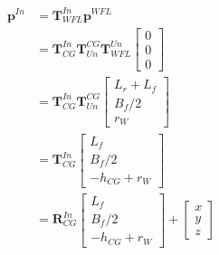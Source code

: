 \begin{align}
  \mathbf{p}^{In} &= \mathbf{T}_{WFL}^{In}\mathbf{p}^{WFL} \\
  &= \mathbf{T}_{CG}^{In}\mathbf{T}_{Un}^{CG}\mathbf{T}_{WFL}^{Un}
  \begin{bmatrix}
    0 \\ 0 \\ 0
  \end{bmatrix} \\
  &= \mathbf{T}_{CG}^{In}\mathbf{T}_{Un}^{CG}
  \begin{bmatrix}
    L_r+L_f \\ B_f/2 \\ r_W
  \end{bmatrix} \\
  &= \mathbf{T}_{CG}^{In}
  \begin{bmatrix}
    L_f \\ B_f/2 \\ -h_{CG} + r_W
  \end{bmatrix} \\
  &=
  \mathbf{R}_{CG}^{In}
  \begin{bmatrix}
    L_f \\ B_f/2 \\ -h_{CG} + r_W
  \end{bmatrix}
  +
  \begin{bmatrix}
    x \\ y \\ z
  \end{bmatrix}
\end{align}












